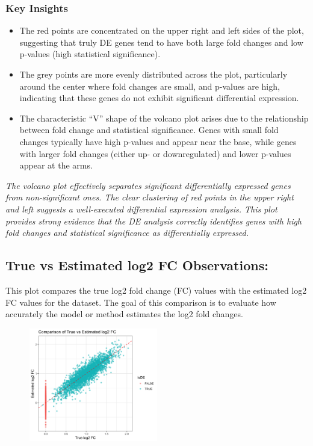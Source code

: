 \documentclass[12pt]{article}
\begin{document}
\subsubsection*{Key Insights}
\begin{itemize}
    \item The red points are concentrated on the upper right and left sides of the plot, suggesting that truly DE genes tend to have both large fold changes and low p-values (high statistical significance).
    \item The grey points are more evenly distributed across the plot, particularly around the center where fold changes are small, and p-values are high, indicating that these genes do not exhibit significant differential expression.
    \item The characteristic ``V'' shape of the volcano plot arises due to the relationship between fold change and statistical significance. Genes with small fold changes typically have high p-values and appear near the base, while genes with larger fold changes (either up- or downregulated) and lower p-values appear at the arms.
\end{itemize}

\textit{The volcano plot effectively separates significant differentially expressed genes from non-significant ones. The clear clustering of red points in the upper right and left suggests a well-executed differential expression analysis. This plot provides strong evidence that the DE analysis correctly identifies genes with high fold changes and statistical significance as differentially expressed.}

\subsection{True vs Estimated log2 FC Observations:} This plot compares the true log2 fold change (FC) values with the estimated log2 FC values for the dataset. The goal of this comparison is to evaluate how accurately the model or method estimates the log2 fold changes.

\begin{figure}[h]
  \centering
  \includegraphics[width=0.5\textwidth]{figure/foldchanges.png}  %
\end{figure}
\end{document}

